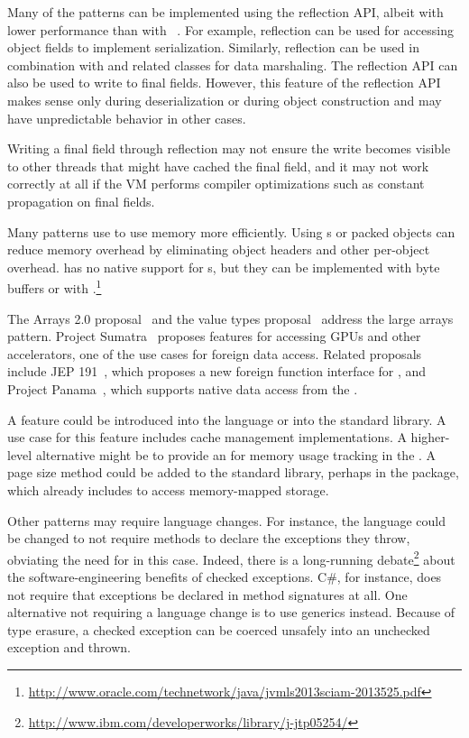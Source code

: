 Many of the patterns can be implemented using the reflection API,
albeit with lower performance than with \unsafe{}~\citep{korlandNoninvasiveConcurrencyJava2010}.
For example,
reflection can be used for accessing object fields to implement serialization.
Similarly, reflection can be used
in combination with
 and related classes for
data marshaling.
The reflection API can also be used to write to final fields.
However, this feature of the reflection API 
makes sense only during deserialization or during object construction and may have
unpredictable behavior in other cases.


Writing a final field through reflection may not ensure
the write becomes visible to other threads that might have cached the final
field, and it may not work correctly at all if the VM performs compiler
optimizations such as constant propagation on final fields.

Many patterns use \unsafe{} to use memory more efficiently.
Using s or packed objects can reduce memory overhead by eliminating object headers and other per-object overhead.
\java{} has no native support for s,
but they can be implemented with byte buffers or with \jni{}.\footnote{\url{http://www.oracle.com/technetwork/java/jvmls2013sciam-2013525.pdf}}

The Arrays 2.0 proposal~\citep{arrays20} and
the value types proposal~\citep{valuetypes} address the large arrays pattern.
Project Sumatra~\citep{layouts} proposes features for accessing GPUs
and other accelerators,
one of the use cases for foreign data access.
Related proposals include JEP 191~\citep{jep191},
which proposes a new foreign function interface for \java{},
and Project Panama~\citep{panama}, which supports native data access from the \jvm{}.

A  feature could be introduced into the language or into the standard library.
A use case for this feature includes cache management implementations.
A higher-level alternative might be to provide an \api{} for memory usage tracking in the \jvm{}.
A page size method could be added to the standard library,
perhaps in the  package,
which already includes  to access memory-mapped storage.

Other patterns may require \java{} language changes.
For instance, 
the language could be changed to not require methods to declare the exceptions they throw,
obviating the need for \unsafe{} in this case.
Indeed, there is a long-running debate\footnote{\url{http://www.ibm.com/developerworks/library/j-jtp05254/}} about the software-engineering benefits of checked exceptions.
C\#, for instance, does not require that exceptions be declared in method signatures at all.
One alternative not requiring a language change
is to use \java{} generics
instead.
Because of type erasure, a checked exception can be coerced unsafely into an unchecked exception and thrown.

